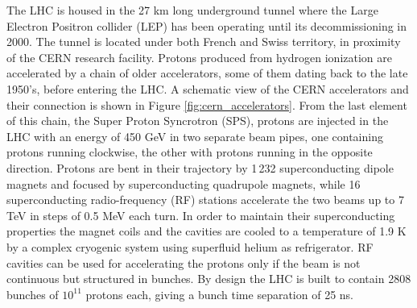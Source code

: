 The LHC is housed in the 27 km long underground tunnel where the Large Electron Positron collider (LEP) has been operating until its decommissioning in 2000. The tunnel is located under both French and Swiss territory, in proximity of the CERN research facility. 
Protons produced from hydrogen ionization are accelerated by a chain of older accelerators, some of them dating back to the late 1950's, before entering the LHC. %
A schematic view of the CERN accelerators and their connection is shown in Figure \ref{fig:cern_accelerators}. From the last element of this chain, the Super Proton Syncrotron (SPS), protons are injected in the LHC with an energy of 450 GeV in two separate beam pipes, one containing protons running clockwise, the other with protons running in the opposite direction. Protons are bent in their trajectory by 1\,232 superconducting dipole magnets and focused by  superconducting quadrupole magnets, while 16 superconducting radio-frequency (RF) stations 
accelerate the two beams up to 7 TeV in steps of 0.5 MeV each turn. In order to maintain their superconducting properties the magnet coils and the cavities are cooled to a temperature of 1.9 K by a complex cryogenic system using superfluid helium as refrigerator. RF cavities can be used for accelerating the protons only if the beam is not continuous but structured in bunches. By design the LHC is built to contain 2808 bunches of $10^{11}$ protons each, giving a bunch time separation of 25 ns.

